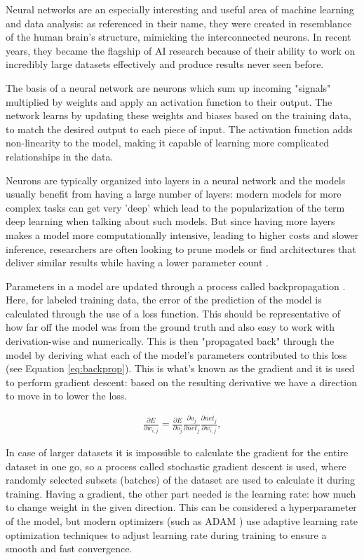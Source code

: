 	Neural networks are an especially interesting and useful area of machine learning and data analysis: as referenced in their name, they were created in resemblance of the human brain's structure, mimicking the interconnected neurons. In recent years, they became the flagship of AI research because of their ability to work on incredibly large datasets effectively and produce results never seen before. 
	
	The basis of a neural network are neurons which sum up incoming "signals" multiplied by weights and apply an activation function to their output. The network learns by updating these weights and biases based on the training data, to match the desired output to each piece of input. The activation function adds non-linearity to the model, making it capable of learning more complicated relationships in the data.
	
	Neurons are typically organized into layers in a neural network and the models usually benefit from having a large number of layers: modern models for more complex tasks can get very 'deep' which lead to the popularization of the term deep learning when talking about such models. But since having more layers makes a model more computationally intensive, leading to higher costs and slower inference, researchers are often looking to prune models or find architectures that deliver similar results while having a lower parameter count \cite{liang2021pruning}.
	
	Parameters in a model are updated through a process called backpropagation \cite{rumelhart1986learning}. Here, for labeled training data, the error of the prediction of the model is calculated through the use of a loss function. This should be representative of how far off the model was from the ground truth and also easy to work with derivation-wise and numerically. This is then "propagated back" through the model by deriving what each of the model's parameters contributed to this loss (see Equation \ref{eq:backprop}). This is what's known as the gradient and it is used to perform gradient descent: based on the resulting derivative we have a direction to move in to lower the loss.
	
	\begin{align}
		\label{eq:backprop}
		\frac{\partial{E}}{\partial{w_{i,j}}} = \frac{\partial{E}}{\partial{o_j}}\frac{\partial{o_j}}{\partial{net_j}}\frac{\partial{net_j}}{\partial{w_{i,j}}},
	\end{align}
	
	
	In case of larger datasets it is impossible to calculate the gradient for the entire dataset in one go, so a process called stochastic gradient descent \cite{amari1993backpropagation} is used, where randomly selected subsets (batches) of the dataset are used to calculate it during training. Having a gradient, the other part needed is the learning rate: how much to change weight in the given direction. This can be considered a hyperparameter of the model, but modern optimizers (such as ADAM \cite{kingma2014adam}) use adaptive learning rate optimization techniques to adjust learning rate during training to ensure a smooth and fast convergence.
	
